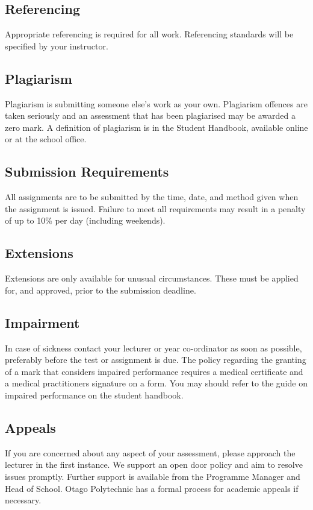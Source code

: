\documentclass{article}
\begin{document}
\subsection*{Referencing}
Appropriate referencing is required for all work.  Referencing standards will be specified by your instructor.

\subsection*{Plagiarism}
Plagiarism is submitting someone else's work as your own.  Plagiarism offences are taken seriously and an
assessment that has been plagiarised may be awarded a zero mark.  A definition of plagiarism is in the Student Handbook,
available online or at the school office.

\subsection*{Submission Requirements}
All assignments are to be submitted by the time, date, and method given when the assignment is issued.
Failure to meet all requirements may result in a penalty of up to 10\% per day (including
weekends).

\subsection*{Extensions}
Extensions are only available for unusual circumstances.  These must be applied for, and approved, prior to the submission deadline.

\subsection*{Impairment}
In case of sickness contact your lecturer or year co-ordinator as soon as possible, preferably before the test or
assignment is due.  The policy regarding the granting of a mark that considers impaired performance requires a medical
certificate and a medical practitioners signature on a form. You may should refer to the guide on impaired performance
on the student handbook.

\subsection*{Appeals}
If you are concerned about any aspect of your assessment, please approach the lecturer in the first instance.  We support
an open door policy and aim to resolve issues promptly.  Further support is available from the Programme
Manager and Head of School. Otago Polytechnic has a formal process for academic appeals if necessary.
\end{document}
